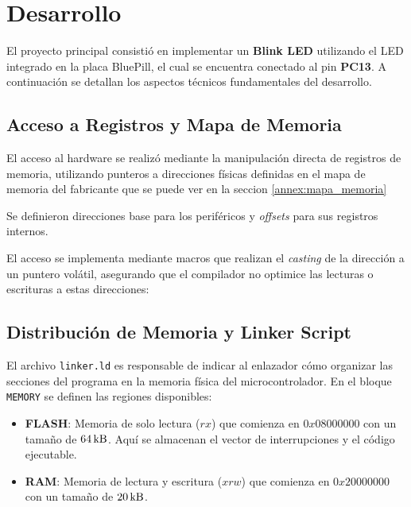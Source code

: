 \chapter{Desarrollo}

El proyecto principal consistió en implementar un \textbf{Blink LED} utilizando el LED 
integrado en la placa BluePill, el cual se encuentra conectado al pin \textbf{PC13}. A 
continuación se detallan los aspectos técnicos fundamentales del desarrollo.

\section{Acceso a Registros y Mapa de Memoria}

El acceso al hardware se realizó mediante la manipulación directa de registros de 
memoria, utilizando punteros a direcciones físicas definidas en el mapa de memoria del fabricante que se puede ver en la
seccion \ref{annex:mapa_memoria}

Se definieron direcciones base para los periféricos y \textit{offsets} para sus 
registros internos.

El acceso se implementa mediante macros que realizan el \textit{casting} de la dirección 
a un puntero volátil, asegurando que el compilador no optimice las lecturas o escrituras 
a estas direcciones:



\section{Distribución de Memoria y Linker Script}

El archivo \texttt{linker.ld} es responsable de indicar al enlazador cómo organizar las 
secciones del programa en la memoria física del microcontrolador. En el bloque 
\texttt{MEMORY} se definen las regiones disponibles:

\begin{itemize}
    \item \textbf{FLASH}: Memoria de solo lectura ($rx$) que comienza en $0x08000000$ con 
    un tamaño de $64 \,\mathrm{kB}$. Aquí se almacenan el vector de interrupciones y el código ejecutable.
    \item \textbf{RAM}: Memoria de lectura y escritura ($xrw$) que comienza en 
    $0x20000000$ con un tamaño de $20 \,\mathrm{kB}$.
\end{itemize}


